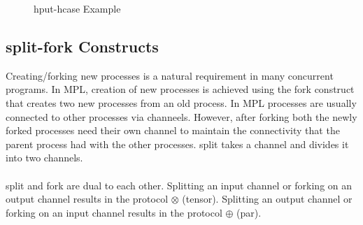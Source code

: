 \documentclass[11pt]{article}
\newcommand{\llab}[1]{\tiny{\texttt{(+)~~~}}
                      \small{$#1$}
                      \tiny{\texttt{~~~(-)}}
                     }
\newcommand{\plab}[1]{\tiny{\texttt{(+)~~~~~}}
                      \small{$#1$}
                     }
\newcommand{\proc}[2] {\small{\sf{$#1$}}\\~~\\ \tiny{{#2}}}
\newcommand{\<}{\langle}
\renewcommand{\>}{\rangle}
\begin{document}
\begin{figure}
\begin{center}
\end {center}
\caption{{\sf hput-hcase} Example} 
\label{fig:Conc_hcase_exam}
\end{figure}

\subsection {split-fork Constructs}
Creating/forking new processes is a natural requirement in many concurrent programs. In MPL, creation of new processes is achieved using the {\sf fork} construct that creates two new processes from an old process. In MPL processes are usually connected to other processes via channeels. However, after forking both the newly forked processes need their own channel to maintain the connectivity that the parent process had with the other processes. {\sf split} takes a channel and divides it into two channels. 
~~\\~~\\ 
{\sf split} and {\sf fork} are dual to each other. Splitting an input channel or forking on an output channel results in the protocol $\mathbf {\otimes}$ (tensor). Splitting an output channel or forking on an input channel results in the protocol $\mathbf {\oplus}$ (par).
\end{document}

